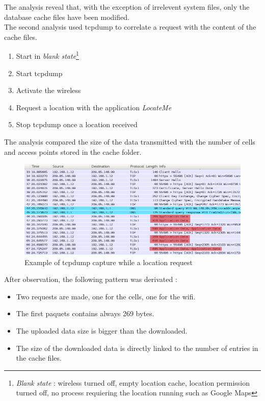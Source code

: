 The analysis reveal that, with the exception of irrelevent system files, only the database cache files have been modified.\\

The second analysis used tcpdump to correlate a request with the content of the cache files.

\begin{enumerate}
\item Start in \emph{blank state}\footnote{\emph{Blank state} : wireless turned off, empty location cache, location permission turned off, no process requiering the location running such as Google Maps}
\item Start tcpdump
\item Activate the wireless
\item Request a location with the application \emph{LocateMe}
\item Stop tcpdump once a location received
\end{enumerate}

The analysis compared the size of the data transmitted with the number of cells and access points stored in the cache folder.\\

\begin{figure}[h]
  \hspace*{-2cm}
  \centering
  \includegraphics[width=17cm]{images/trace2.png}
  \caption{Example of tcpdump capture while a location request}
  \label{fig:tcpdump}
\end{figure}

After observation, the following pattern was derivated :
\begin{itemize}
\item Two requests are made, one for the cells, one for the wifi.
\item The first paquets contains always 269 bytes.
\item The uploaded data size is bigger than the downloaded.
\item The size of the downloaded data is directly linked to the number of entries in the cache files.
\end{itemize}

